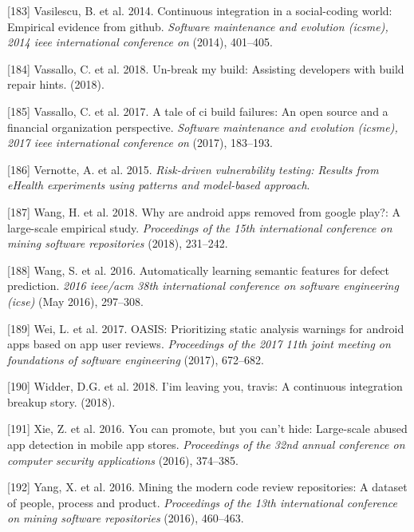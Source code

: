 \documentclass[]{book}
\begin{document}
\hypertarget{ref-vasilescu2014continuous}{}
{[}183{]} Vasilescu, B. et al. 2014. Continuous integration in a
social-coding world: Empirical evidence from github. \emph{Software
maintenance and evolution (icsme), 2014 ieee international conference
on} (2014), 401--405.

\hypertarget{ref-vassallo2018break}{}
{[}184{]} Vassallo, C. et al. 2018. Un-break my build: Assisting
developers with build repair hints. (2018).

\hypertarget{ref-vassallo2017tale}{}
{[}185{]} Vassallo, C. et al. 2017. A tale of ci build failures: An open
source and a financial organization perspective. \emph{Software
maintenance and evolution (icsme), 2017 ieee international conference
on} (2017), 183--193.

\hypertarget{ref-vernotte2015}{}
{[}186{]} Vernotte, A. et al. 2015. \emph{Risk-driven vulnerability
testing: Results from eHealth experiments using patterns and model-based
approach}.

\hypertarget{ref-wang2018android}{}
{[}187{]} Wang, H. et al. 2018. Why are android apps removed from google
play?: A large-scale empirical study. \emph{Proceedings of the 15th
international conference on mining software repositories} (2018),
231--242.

\hypertarget{ref-wang2016}{}
{[}188{]} Wang, S. et al. 2016. Automatically learning semantic features
for defect prediction. \emph{2016 ieee/acm 38th international conference
on software engineering (icse)} (May 2016), 297--308.

\hypertarget{ref-wei2017oasis}{}
{[}189{]} Wei, L. et al. 2017. OASIS: Prioritizing static analysis
warnings for android apps based on app user reviews. \emph{Proceedings
of the 2017 11th joint meeting on foundations of software engineering}
(2017), 672--682.

\hypertarget{ref-widder2018m}{}
{[}190{]} Widder, D.G. et al. 2018. I'im leaving you, travis: A
continuous integration breakup story. (2018).

\hypertarget{ref-xie2016you}{}
{[}191{]} Xie, Z. et al. 2016. You can promote, but you can't hide:
Large-scale abused app detection in mobile app stores. \emph{Proceedings
of the 32nd annual conference on computer security applications} (2016),
374--385.

\hypertarget{ref-yang2016mining}{}
{[}192{]} Yang, X. et al. 2016. Mining the modern code review
repositories: A dataset of people, process and product.
\emph{Proceedings of the 13th international conference on mining
software repositories} (2016), 460--463.
\end{document}
